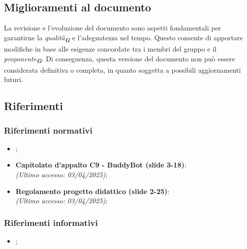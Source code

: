 \subsection{Miglioramenti al documento}
La revisione e l’evoluzione del documento sono aspetti fondamentali per garantirne la \emph{qualità}\textsubscript{\textbf{\textit{G}}}
e l’adeguatezza nel tempo.
Questo consente di apportare modifiche in base alle esigenze concordate tra i membri del gruppo e il
\emph{proponente}\textsubscript{\textbf{\textit{G}}}.
Di conseguenza, questa versione del documento non può essere considerata definitiva o completa, in quanto soggetta a possibili
aggiornamenti futuri.

\subsection{Riferimenti}
\label{sec:riferimenti}

\subsubsection{Riferimenti normativi}
\begin{itemize}
    \item {}; \\
    \item \textbf{Capitolato d'appalto C9 - BuddyBot (slide 3-18)}: \\
    \emph{(Ultimo accesso: 03/04/2025)};\\
    \item \textbf{Regolamento progetto didattico (slide 2-25)}:\\
    \emph{(Ultimo accesso: 03/04/2025)};\\
\end{itemize}

\subsubsection{Riferimenti informativi}
\begin{itemize}
    \item {}; \\
\end{itemize}
